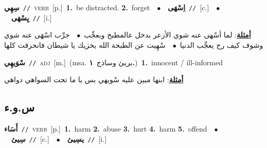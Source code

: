 \documentclass[10pt,a4paper,twoside]{article} %
\begin{document}
\begin{multicols}{2}
{\setlength\topsep{0pt}\textbf{\foreignlanguage{arabic}{سِهِي}}\ {\color{gray}\texttt{//}\color{black}}\ \textsc{verb}\ [p.]\ \textbf{1.}~be distracted.  \textbf{2.}~forget\ \ $\bullet$\ \ \setlength\topsep{0pt}\textbf{\foreignlanguage{arabic}{اِسْهَى}}\ {\color{gray}\texttt{//}\color{black}}\ [c.]\ \ $\bullet$\ \ \setlength\topsep{0pt}\textbf{\foreignlanguage{arabic}{يِسْهَى}}\ {\color{gray}\texttt{//}\color{black}}\ [i.]\  \begin{flushright}\color{gray}\foreignlanguage{arabic}{\textbf{\underline{\foreignlanguage{arabic}{أمثلة}}}: لما أسْهى عنه شوي الأزعر بدخل عالمطبخ وبعجِّب\ $\bullet$\ \  جرِّب اسْهَى عنه شوي وشوف كيف رح يعجِّب الدنيا\ $\bullet$\ \  سْهِيت عن الطبحة الله يخزيك يا شيطان فانحرقت كلها}\end{flushright}\color{black}} \vspace{2mm}

{\setlength\topsep{0pt}\textbf{\foreignlanguage{arabic}{سْوَيهِي}}\ {\color{gray}\texttt{//}\color{black}}\ \textsc{adj}\ [m.]\ \color{gray}(msa. \foreignlanguage{arabic}{بريئ وساذج}~\foreignlanguage{arabic}{\textbf{١.}})\color{black}\ \textbf{1.}~innocent / ill-informed\  \begin{flushright}\color{gray}\foreignlanguage{arabic}{\textbf{\underline{\foreignlanguage{arabic}{أمثلة}}}: ابنها مبين عليه سْويهي بس يا ما تحت السواهي دواهي}\end{flushright}\color{black}} \vspace{2mm}

\vspace{-3mm}
\subsection*{\color{blue}\foreignlanguage{arabic}{س.و.ء}\color{blue}{}} 

{\setlength\topsep{0pt}\textbf{\foreignlanguage{arabic}{أَسَاء}}\ {\color{gray}\texttt{//}\color{black}}\ \textsc{verb}\ [p.]\ \textbf{1.}~harm  \textbf{2.}~abuse  \textbf{3.}~hurt  \textbf{4.}~harm  \textbf{5.}~offend\ \ $\bullet$\ \ \setlength\topsep{0pt}\textbf{\foreignlanguage{arabic}{سِيئ}}\ {\color{gray}\texttt{//}\color{black}}\ [c.]\ \ $\bullet$\ \ \setlength\topsep{0pt}\textbf{\foreignlanguage{arabic}{يسِيئ}}\ {\color{gray}\texttt{//}\color{black}}\ [i.]\ } \vspace{2mm}


\end{multicols}
\end{document}

